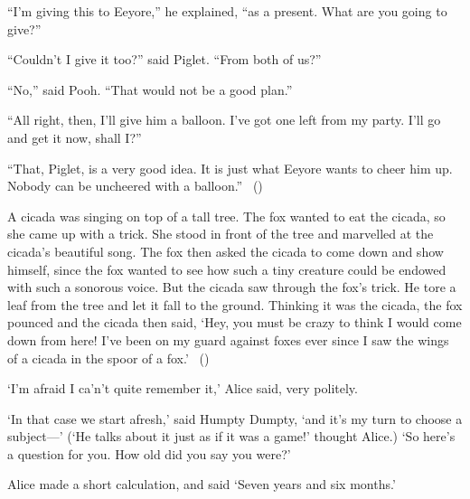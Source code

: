 \begin{note}
  \begin{scenario}
    \indent ``I'm giving this to Eeyore,'' he explained, ``as a present.
    What are you going to give?''

    ``Couldn't I give it too?'' said Piglet.
    ``From both of us?''

    ``No,'' said Pooh.
    ``That would not be a good plan.''

    ``All right, then, I'll give him a balloon.
    I've got one left from my party.
    I'll go and get it now, shall I?''

    ``That, Piglet, is a very good idea.
    It is just what Eeyore wants to cheer him up.
    Nobody can be uncheered with a balloon.''%
    \mbox{ }\hfill\mbox{(\cite[78--79]{Milne:2009aa})}\newline
    \mbox{ }
  \end{scenario}

  \begin{scenario}
    A cicada was singing on top of a tall tree.
    The fox wanted to eat the cicada, so she came up with a trick.
    She stood in front of the tree and marvelled at the cicada's beautiful song.
    The fox then asked the cicada to come down and show himself, since the fox wanted to see how such a tiny creature could be endowed with such a sonorous voice.
    But the cicada saw through the fox's trick.
    He tore a leaf from the tree and let it fall to the ground.
    Thinking it was the cicada, the fox pounced and the cicada then said,
    `Hey, you must be crazy to think I would come down from here! I've been on my guard against foxes ever since I saw the wings of a cicada in the spoor of a fox.'%
    \mbox{ }\hfill\mbox{(\cite[136]{Aesop:2002aa})}\newline
    \mbox{ }
  \end{scenario}

  \begin{scenario}
    `I'm afraid I ca'n't quite remember it,'
    Alice said, very politely.

    \noindent%
    `In that case we start afresh,'
    said Humpty Dumpty,
    `and it's my turn to choose a subject---'
    (`He talks about it just as if it was a game!' thought Alice.)
    `So here's a question for you. How old did you say you were?'

    \noindent%
    Alice made a short calculation, and said
    `Seven years and six months.'


\end{scenario}
\end{note}
